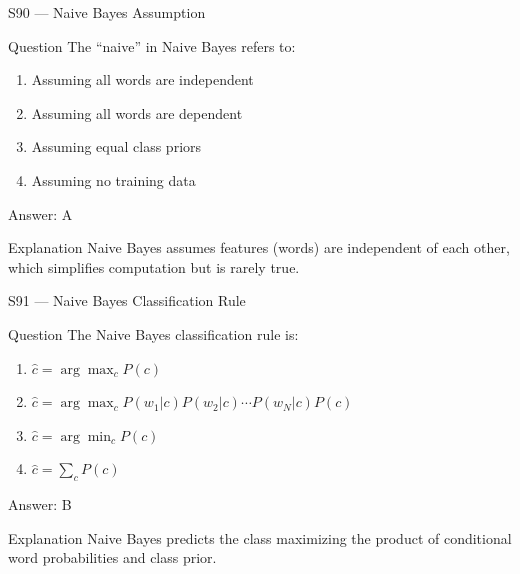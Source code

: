\documentclass[aspectratio=169,8pt]{beamer}
\begin{document}
	\begin{frame}{S90 --- Naive Bayes Assumption}
		\begin{block}{Question}
			The ``naive'' in Naive Bayes refers to:
			\begin{enumerate}
				\item Assuming all words are independent
				\item Assuming all words are dependent
				\item Assuming equal class priors
				\item Assuming no training data
			\end{enumerate}
		\end{block}
		\begin{exampleblock}{Answer: A}\end{exampleblock}
		\begin{block}{Explanation}
			Naive Bayes assumes features (words) are independent of each other, which simplifies computation but is rarely true.
		\end{block}
	\end{frame}
	
	\begin{frame}{S91 --- Naive Bayes Classification Rule}
		\begin{block}{Question}
			The Naive Bayes classification rule is:
			\begin{enumerate}
				\item $\hat{c} = \arg\max_c P(c)$
				\item $\hat{c} = \arg\max_c P(w_1|c)P(w_2|c)\cdots P(w_N|c)P(c)$
				\item $\hat{c} = \arg\min_c P(c)$
				\item $\hat{c} = \sum_c P(c)$
			\end{enumerate}
		\end{block}
		\begin{exampleblock}{Answer: B}\end{exampleblock}
		\begin{block}{Explanation}
			Naive Bayes predicts the class maximizing the product of conditional word probabilities and class prior.
		\end{block}
	\end{frame}
	
\end{document}

